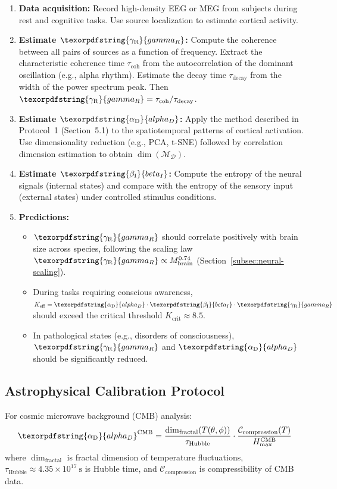 \documentclass[12pt,a4paper]{article}
\DeclareRobustCommand{\alD}{\texorpdfstring{\ensuremath{\alpha_{\mathrm{D}}}}{alpha_D}}
\DeclareRobustCommand{\beI}{\texorpdfstring{\ensuremath{\beta_{\mathrm{I}}}}{beta_I}}
\DeclareRobustCommand{\gaR}{\texorpdfstring{\ensuremath{\gamma_{\mathrm{R}}}}{gamma_R}}
\newcommand{\Dict}{\mathcal{D}}
\newcommand{\Mdict}{\mathcal{M}_{\Dict}}
\newcommand{\Ke}{K_{\mathrm{eff}}}
\newcommand{\Kcrit}{K_{\mathrm{crit}}}
\begin{document}
	\begin{enumerate}
		\item \textbf{Data acquisition:} Record high-density EEG or MEG from subjects during rest and cognitive tasks. Use source localization to estimate cortical activity.
		\item \textbf{Estimate \(\gaR\):} Compute the coherence between all pairs of sources as a function of frequency. Extract the characteristic coherence time \(\tau_{\text{coh}}\) from the autocorrelation of the dominant oscillation (e.g., alpha rhythm). Estimate the decay time \(\tau_{\text{decay}}\) from the width of the power spectrum peak. Then \(\gaR = \tau_{\text{coh}} / \tau_{\text{decay}}\).
		\item \textbf{Estimate \(\alD\):} Apply the method described in Protocol~1 (Section~5.1) to the spatiotemporal patterns of cortical activation. Use dimensionality reduction (e.g., PCA, t-SNE) followed by correlation dimension estimation to obtain \(\dim(\Mdict)\).
		\item \textbf{Estimate \(\beI\):} Compute the entropy of the neural signals (internal states) and compare with the entropy of the sensory input (external states) under controlled stimulus conditions.
		\item \textbf{Predictions:} 
		\begin{itemize}
			\item \(\gaR\) should correlate positively with brain size across species, following the scaling law \(\gaR \propto M_{\text{brain}}^{0.74}\) (Section~\ref{subsec:neural-scaling}).
			\item During tasks requiring conscious awareness, \(\Ke = \alD \cdot \beI \cdot \gaR\) should exceed the critical threshold \(\Kcrit \approx 8.5\).
			\item In pathological states (e.g., disorders of consciousness), \(\gaR\) and \(\alD\) should be significantly reduced.
		\end{itemize}
	\end{enumerate}
	
	\subsection{Astrophysical Calibration Protocol}
	\label{subsec:astro-calibration}
	
	For cosmic microwave background (CMB) analysis:
	\[
	\alD^{\mathrm{CMB}} = \frac{\dim_{\mathrm{fractal}}(T(\theta,\phi))}{\tau_{\mathrm{Hubble}}} \cdot \frac{\mathcal{C}_{\mathrm{compression}}(T)}{H_{\max}^{\mathrm{CMB}}}
	\]
	where \(\dim_{\mathrm{fractal}}\) is fractal dimension of temperature fluctuations, \(\tau_{\mathrm{Hubble}} \approx 4.35 \times 10^{17}\ \mathrm{s}\) is Hubble time, and \(\mathcal{C}_{\mathrm{compression}}\) is compressibility of CMB data.
	
\end{document}

